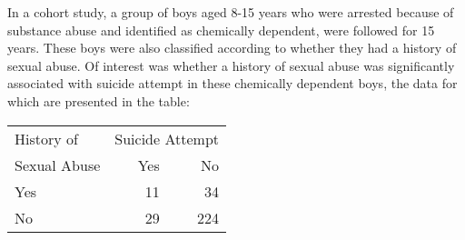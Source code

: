 
In a cohort study, a group of boys aged 8-15 years who were arrested because of substance abuse and identified as chemically dependent, were followed for 15 years.  These boys were also classified according to whether they had a history of sexual abuse.  Of interest was whether a history of sexual abuse was significantly associated with suicide attempt in these chemically dependent boys, the data for which are presented in the table:

\begin{center}
\begin{tabular}{lrr}
History of & \multicolumn{2}{c}{Suicide Attempt}\\
Sexual Abuse & Yes & No\\\hline
Yes & 11 & 34\\
No & 29 & 224\\
\end{tabular}
\end{center}

